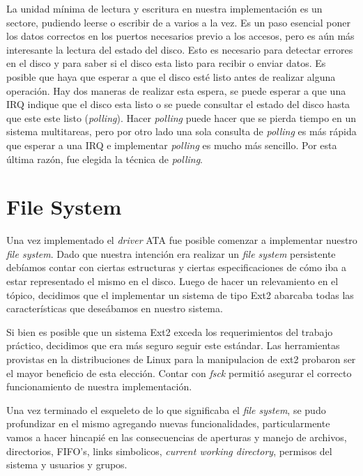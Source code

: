 \documentclass[a4paper,10pt]{article}
\begin{document}
    La unidad mínima de lectura y escritura en nuestra implementación es un sectore, pudiendo leerse o escribir de a
    varios a la vez. Es un paso esencial poner los datos correctos en los puertos necesarios previo a los accesos, pero
    es aún más interesante la lectura del estado del disco. Esto es necesario para detectar errores en el disco
    y para saber si el disco esta listo para recibir o enviar datos. Es posible que haya que esperar a que el disco
    esté listo antes de realizar alguna operación. Hay dos maneras de realizar esta espera, se puede esperar a que una IRQ
    indique que el disco esta listo o se puede consultar el estado del disco hasta que este este listo (\textit{polling}).
    Hacer \textit{polling} puede hacer que se pierda tiempo en un sistema multitareas, pero por otro lado una sola
    consulta de \textit{polling} es más rápida que esperar a una IRQ e implementar \textit{polling} es mucho más sencillo.
    Por esta última razón, fue elegida la técnica de \textit{polling}.

\newpage
\section{File System}
    
Una vez implementado el \textit{driver} ATA fue posible comenzar a implementar nuestro \textit{file system}.
Dado que nuestra intención era realizar un \textit{file system} persistente debíamos contar con ciertas estructuras
y ciertas especificaciones de cómo iba a estar representado el mismo en el disco. Luego de hacer un relevamiento
en el tópico, decidimos que el implementar un sistema de tipo Ext2 abarcaba todas las características que deseábamos
en nuestro sistema. 

Si bien es posible que un sistema Ext2 exceda los requerimientos del trabajo práctico, decidimos que era más seguro seguir este estándar. 
Las herramientas provistas en la distribuciones de Linux para la manipulacion de ext2 probaron ser el mayor beneficio de esta elección.
Contar con \textit{fsck} permitió asegurar el correcto funcionamiento de nuestra implementación.

Una vez terminado el esqueleto de lo que significaba el \textit{file system}, se pudo profundizar en el mismo agregando
nuevas funcionalidades, particularmente vamos a hacer hincapié en las consecuencias de aperturas y manejo de
archivos, directorios, FIFO's, links simbolicos, \textit{current working
directory}, permisos del sistema y usuarios y grupos.
\end{document}
